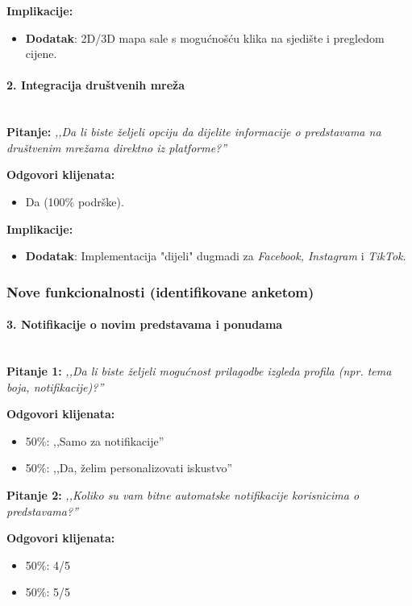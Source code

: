\textbf{Implikacije:}  
\begin{itemize}  
    \item \textbf{Dodatak}: 2D/3D mapa sale s mogućnošću klika na sjedište i pregledom cijene.  
\end{itemize}  

\paragraph*{2. Integracija društvenih mreža}~\\
\textbf{Pitanje:}  
\emph{,,Da li biste željeli opciju da dijelite informacije o predstavama na društvenim mrežama direktno iz platforme?''}  

\textbf{Odgovori klijenata:}  
\begin{itemize}  
    \item Da (100\% podrške).  
\end{itemize}  

\textbf{Implikacije:}  
\begin{itemize}  
    \item \textbf{Dodatak}: Implementacija "dijeli" dugmadi za \emph{Facebook, Instagram} i \emph{TikTok}.  
\end{itemize}  

\subsubsection*{Nove funkcionalnosti (identifikovane anketom)}  

\paragraph*{3. Notifikacije o novim predstavama i ponudama}~\\  
\textbf{Pitanje 1:}  
\emph{,,Da li biste željeli mogućnost prilagodbe izgleda profila (npr. tema boja, notifikacije)?''}  

\textbf{Odgovori klijenata:}  
\begin{itemize}  
    \item 50\%: ,,Samo za notifikacije''  
    \item 50\%: ,,Da, želim personalizovati iskustvo''  
\end{itemize}  

\textbf{Pitanje 2:}  
\emph{,,Koliko su vam bitne automatske notifikacije korisnicima o predstavama?''}  

\textbf{Odgovori klijenata:}  
\begin{itemize}  
    \item 50\%: 4/5  
    \item 50\%: 5/5  
\end{itemize}  

